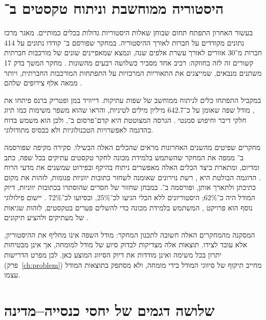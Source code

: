 \section{היסטוריה ממוחשבת וניתוח טקסטים ב־}
\label{sec:lit-computational}

בעשור האחרון התפתח תחום שבוחן שאלות היסטוריות גדולות בכלים כמותיים. מאגר  מרכז נתונים מקודדים על חברות לאורך ההיסטוריה. במחקר שפורסם ב־ קודדו נתונים על 414 חברות מ־30 אזורים לאורך עשרת אלפים שנה, ונמצא שמאפיינים שונים של מורכבות חברתית קשורים זה לזה בחוזקה: רכיב אחד מסביר כשלושה רבעים מהשונות \cite{turchin2018quantitative}. מחקר המשך בדק 17 משתנים מנבאים, שמייצגים את התאוריות המרכזיות על התפתחות המורכבות החברתית, ויותר ממאה אלף צירופים שלהם \cite{turchin2022disentangling}.

במקביל התפתחו כלים לניתוח ממוחשב של שפות עתיקות. דייוויד במן ופטריק ברנס פיתחו את , מודל שפה שאומן על כ־642.7 מיליון מילים לטיניות, והראו שהוא משפר משימות כמו תיוג חלקי דיבר וחיפוש סמנטי \cite{bamman2020latinbert}. הגרסה המצוטטת היא קדם־פרסום ב־, ולכן הוא משמש בדוח כהדגמה לאפשרויות הטכנולוגיות ולא כבסיס מתודולוגי.

מחקרים שפיטים מהשנים האחרונות מראים שהכלים האלה הבשילו. סקירה מקיפה שפורסמה ב־ ממפה את המחקר שהשתמש בלמידת מכונה לחקר טקסטים עתיקים בכל שפה, כתב ומדיום, ומתארת כיצד הכלים האלה מאפשרים ניתוח בהיקף ובפירוט שמשנים את מדעי הרוח \cite{sommerschield2023survey}. הדוגמה הבולטת היא , רשת נוירונים שאומנה לשחזר כתובות יווניות פגומות, לזהות את מקום כתיבתן ולתארך אותן, ופורסמה ב־. במבחן שחזור של חסרים שהוסתרו בכתובות יווניות, דיוק המודל היה כ־62\%; היסטוריונים ללא הכלי הגיעו לכ־25\%, ובסיועו לכ־72\% \cite{assael2022ithaca}. יישום פילולוגי נוסף הוא פרויקט , המשתמש בלמידת מכונה כדי להשלים פערים בטקסטים, לזהות שגיאות של מעתיקים ולהציע תיקונים \cite{graziosi2023philology}.

המסקנה מהמחקרים האלה חשובה לתכנון המחקר: מודל השפה אינו מחליף את ההיסטוריון, אלא עובד לצידו. תוצאות אלה מצדיקות לבדוק סיוע של מודל למומחה, אך אינן מבטיחות יתרון בכל משימה ואינן מודדות את דיוק הסיווג המוצע כאן. לכן מפרט הדרישות (פרק~\ref{ch:problem}) מחייב תיקוף של סיווגי המודל בידי מומחה, ולא מסתפק בתוצאות המודל עצמו.

\section{שלושה דגמים של יחסי כנסייה–מדינה}
\label{sec:lit-models}

